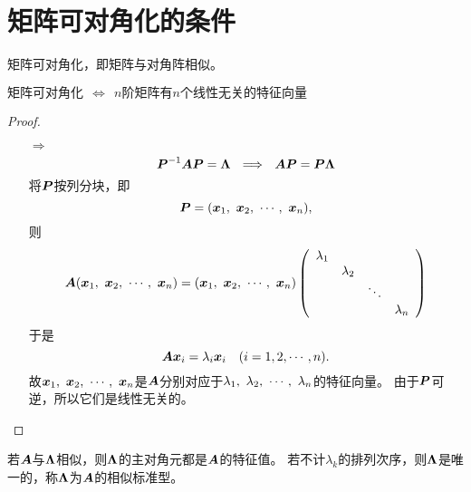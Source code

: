 \section{矩阵可对角化的条件}
\begin{frame}  
    矩阵可对角化，即矩阵与对角阵相似。    
\end{frame}

\begin{frame}
  
    \begin{dingli}
      $\mbox{矩阵可对角化} ~~\Longleftrightarrow~~
      \mbox{$n$阶矩阵有$n$个线性无关的特征向量}$ 
    \end{dingli}
    \pause
    \begin{proof}
      \begin{itemize}
      \item[$\Rightarrow$] 
        $$
        \boldsymbol{P}^{-1}\boldsymbol{A}\boldsymbol{P}=\boldsymbol{\Lambda}  ~~\Longrightarrow~~
        \boldsymbol{A}\boldsymbol{P}=\boldsymbol{P}\boldsymbol{\Lambda}
        $$\pause
        将$\boldsymbol{P}$按列分块，即
        $$
        \boldsymbol{P}=({\boldsymbol{x}}_1,~{\boldsymbol{x}}_2,~\cdots,~{\boldsymbol{x}}_n),
        $$
        则
        $$
        \boldsymbol{A}({\boldsymbol{x}}_1,~{\boldsymbol{x}}_2,~\cdots,~{\boldsymbol{x}}_n)=({\boldsymbol{x}}_1,~{\boldsymbol{x}}_2,~\cdots,~{\boldsymbol{x}}_n)\left(
          \begin{array}{cccc}
            \lambda_1&&&\\
                     &\lambda_2&&\\
                     &&\ddots&\\
                     &&&\lambda_n
          \end{array}
        \right)
        $$\pause
        于是
        $$
        \boldsymbol{A}{\boldsymbol{x}}_i=\lambda_i{\boldsymbol{x}}_i\quad(i=1,2,\cdots,n).
        $$\pause
        故${\boldsymbol{x}}_1,~{\boldsymbol{x}}_2,~\cdots,~{\boldsymbol{x}}_n$是$\boldsymbol{A}$分别对应于$\lambda_1,~\lambda_2,~\cdots,~\lambda_n$的特征向量。\pause
        由于$\boldsymbol{P}$可逆，所以它们是线性无关的。
      \end{itemize}
    \end{proof}
\end{frame}


\begin{frame}
  
    若$\boldsymbol{A}$与$\boldsymbol{\Lambda}$相似，则$\boldsymbol{\Lambda}$的主对角元都是$\boldsymbol{A}$的特征值。
    若不计$\lambda_k$的排列次序，则$\boldsymbol{\Lambda}$是唯一的，称$\boldsymbol{\Lambda}$为$\boldsymbol{A}$的相似标准型。
  
\end{frame}



